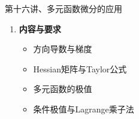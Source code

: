 
\begin{frame}{第十六讲、多元函数微分的应用}
	\linespread{1.5}
	\begin{enumerate}
	  \item {\bf 内容与要求}
	  \begin{itemize}
	    \item 方向导数与梯度
	    \item Hessian矩阵与Taylor公式
	    \item 多元函数的极值
	    \item 条件极值与Lagrange乘子法
	  \vspace{1em}
	  \end{itemize}
	\end{enumerate}
\end{frame}

% 		  

